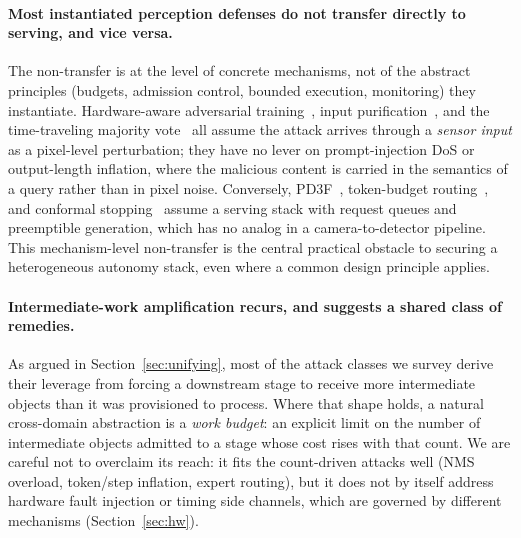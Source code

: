 \documentclass[acmsmall,screen,review,nonacm]{acmart}
\begin{document}
\paragraph{Most instantiated perception defenses do not transfer directly to serving, and vice versa.} The non-transfer is at the level of concrete mechanisms, not of the abstract principles (budgets, admission control, bounded execution, monitoring) they instantiate. Hardware-aware adversarial training~\cite{wang2025cantslow}, input purification~\cite{li2025ldp,ren2025dct}, and the time-traveling majority vote~\cite{etim2024timetraveling} all assume the attack arrives through a \emph{sensor input} as a pixel-level perturbation; they have no lever on prompt-injection DoS or output-length inflation, where the malicious content is carried in the semantics of a query rather than in pixel noise. Conversely, PD3F~\cite{zhang2025pd3f}, token-budget routing~\cite{chen2026tokenbudget}, and conformal stopping~\cite{wang2026conformal} assume a serving stack with request queues and preemptible generation, which has no analog in a camera-to-detector pipeline. This mechanism-level non-transfer is the central practical obstacle to securing a heterogeneous autonomy stack, even where a common design principle applies.

\paragraph{Intermediate-work amplification recurs, and suggests a shared class of remedies.}
As argued in Section~\ref{sec:unifying}, most of the attack classes we survey derive their leverage from forcing a downstream stage to receive more intermediate objects than it was provisioned to process. Where that shape holds, a natural cross-domain abstraction is a \emph{work budget}: an explicit limit on the number of intermediate objects admitted to a stage whose cost rises with that count. We are careful not to overclaim its reach: it fits the count-driven attacks well (NMS overload, token/step inflation, expert routing), but it does not by itself address hardware fault injection or timing side channels, which are governed by different mechanisms (Section~\ref{sec:hw}).
\end{document}
